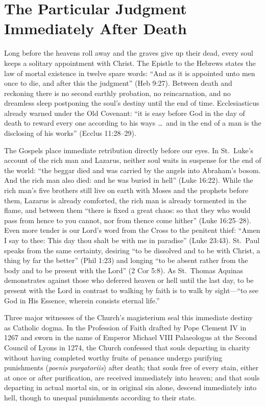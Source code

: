 \section{The Particular Judgment Immediately After Death}

Long before the heavens roll away and the graves give up their dead, every soul keeps a solitary appointment with Christ. The Epistle to the Hebrews states the law of mortal existence in twelve spare words: ``And as it is appointed unto men once to die, and after this the judgment'' (Heb 9:27). Between death and reckoning there is no second earthly probation, no reincarnation, and no dreamless sleep postponing the soul's destiny until the end of time. Ecclesiasticus already warned under the Old Covenant: ``it is easy before God in the day of death to reward every one according to his ways \dots\ and in the end of a man is the disclosing of his works'' (Ecclus 11:28--29).

The Gospels place immediate retribution directly before our eyes. In St.\ Luke's account of the rich man and Lazarus, neither soul waits in suspense for the end of the world: ``the beggar died and was carried by the angels into Abraham's bosom. And the rich man also died: and he was buried in hell'' (Luke 16:22). While the rich man's five brothers still live on earth with Moses and the prophets before them, Lazarus is already comforted, the rich man is already tormented in the flame, and between them ``there is fixed a great chaos: so that they who would pass from hence to you cannot, nor from thence come hither'' (Luke 16:25--28). Even more tender is our Lord's word from the Cross to the penitent thief: ``Amen I say to thee: This day thou shalt be with me in paradise'' (Luke 23:43). St.\ Paul speaks from the same certainty, desiring ``to be dissolved and to be with Christ, a thing by far the better'' (Phil 1:23) and longing ``to be absent rather from the body and to be present with the Lord'' (2 Cor 5:8). As St.\ Thomas Aquinas demonstrates against those who deferred heaven or hell until the last day, to be present with the Lord in contrast to walking by faith is to walk by sight---``to see God in His Essence, wherein consists eternal life.''

Three major witnesses of the Church's magisterium seal this immediate destiny as Catholic dogma. In the Profession of Faith drafted by Pope Clement IV in 1267 and sworn in the name of Emperor Michael VIII Palaeologus at the Second Council of Lyons in 1274, the Church confessed that souls departing in charity without having completed worthy fruits of penance undergo purifying punishments (\textit{poenis purgatoriis}) after death; that souls free of every stain, either at once or after purification, are received immediately into heaven; and that souls departing in actual mortal sin, or in original sin alone, descend immediately into hell, though to unequal punishments according to their state.

